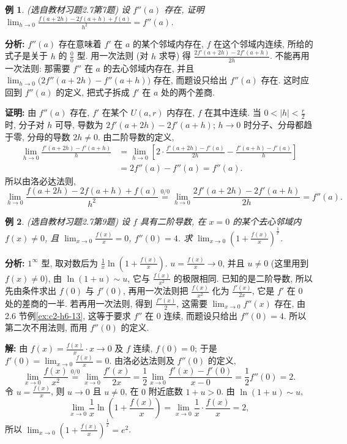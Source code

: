 \documentclass[UTF8,openany]{ctexbook}
\theoremstyle{chinesetextbook}
\newtheorem{example}{例}[section]
\newenvironment{cnproof}{\par\indent\textbf{证明:} \ignorespaces}{\par}
\newenvironment{cnsolution}{\par\indent\textbf{解:} \ignorespaces}{\par}
\begin{document}
\begin{example}\label{ex:c2-h7-7}
\textnormal{(选自教材习题2.7第7题)} 设 $f''(a)$ 存在, 证明 $\displaystyle\lim_{h\to0}\frac{f(a+2h)-2f(a+h)+f(a)}{h^2}=f''(a)$.
\end{example}
\par\indent\textbf{分析:} $f''(a)$ 存在意味着 $f'$ 在 $a$ 的某个邻域内存在, $f$ 在这个邻域内连续, 所给的式子是关于 $h$ 的 $\displaystyle\frac00$ 型. 用一次法则 (对 $h$ 求导) 得 $\displaystyle\frac{2f'(a+2h)-2f'(a+h)}{2h}$. 不能再用一次法则: 那需要 $f''$ 在 $a$ 的去心邻域内存在, 并且 $\displaystyle\lim_{h\to0}\bigl(2f''(a+2h)-f''(a+h)\bigr)$ 存在, 而题设只给出 $f''(a)$ 存在. 这时应回到 $f''(a)$ 的定义, 把式子拆成 $f'$ 在 $a$ 处的两个差商.
\begin{cnproof}
由 $f''(a)$ 存在, $f'$ 在某个 $U(a,r)$ 内存在, $f$ 在其中连续. 当 $\displaystyle0<|h|<\frac r2$ 时, 分子对 $h$ 可导, 导数为 $2f'(a+2h)-2f'(a+h)$; $h\to0$ 时分子、分母都趋于零, 分母的导数 $2h\ne0$. 由二阶导数的定义,
\[
\begin{aligned}
\lim_{h\to0}\frac{f'(a+2h)-f'(a+h)}h&=\lim_{h\to0}\left[2\cdot\frac{f'(a+2h)-f'(a)}{2h}-\frac{f'(a+h)-f'(a)}h\right]\\
&=2f''(a)-f''(a)=f''(a).
\end{aligned}
\]
所以由洛必达法则,
\[
\lim_{h\to0}\frac{f(a+2h)-2f(a+h)+f(a)}{h^2}\overset{0/0}{=}\lim_{h\to0}\frac{2f'(a+2h)-2f'(a+h)}{2h}=f''(a).
\]
\end{cnproof}
\begin{example}\label{ex:c2-h7-9}
\textnormal{(选自教材习题2.7第9题)} 设 $f$ 具有二阶导数, 在 $x=0$ 的某个去心邻域内 $f(x)\ne0$, 且 $\displaystyle\lim_{x\to0}\frac{f(x)}x=0$, $f''(0)=4$. 求 $\displaystyle\lim_{x\to0}\left(1+\frac{f(x)}x\right)^{\frac1x}$.
\end{example}
\par\indent\textbf{分析:} $1^\infty$ 型, 取对数后为 $\displaystyle\frac1x\ln\left(1+\frac{f(x)}x\right)$. $\displaystyle u=\frac{f(x)}x\to0$, 并且 $u\ne0$ (这里用到 $f(x)\ne0$), 由 $\ln(1+u)\sim u$, 它与 $\displaystyle\frac{f(x)}{x^2}$ 的极限相同. 已知的是二阶导数, 所以先由条件求出 $f(0)$ 与 $f'(0)$, 再用一次法则把 $\displaystyle\frac{f(x)}{x^2}$ 化为 $\displaystyle\frac{f'(x)}{2x}$, 它是 $f'$ 在 $0$ 处的差商的一半. 若再用一次法则, 得到 $\displaystyle\frac{f''(x)}2$, 这需要 $\displaystyle\lim_{x\to0}f''(x)$ 存在, 由 2.6 节例\ref{ex:c2-h6-13}, 这等于要求 $f''$ 在 $0$ 连续, 而题设只给出 $f''(0)=4$. 所以第二次不用法则, 而用 $f''(0)$ 的定义.
\begin{cnsolution}
由 $\displaystyle f(x)=\frac{f(x)}x\cdot x\to0$ 及 $f$ 连续, $f(0)=0$; 于是 $\displaystyle f'(0)=\lim_{x\to0}\frac{f(x)}x=0$. 由洛必达法则及 $f''(0)$ 的定义,
\[
\lim_{x\to0}\frac{f(x)}{x^2}\overset{0/0}{=}\lim_{x\to0}\frac{f'(x)}{2x}=\frac12\lim_{x\to0}\frac{f'(x)-f'(0)}{x-0}=\frac12f''(0)=2.
\]
令 $\displaystyle u=\frac{f(x)}x$, 则 $u\to0$ 且 $u\ne0$, 在 $0$ 附近底数 $1+u>0$. 由 $\ln(1+u)\sim u$,
\[
\lim_{x\to0}\frac1x\ln\left(1+\frac{f(x)}x\right)=\lim_{x\to0}\frac1x\cdot\frac{f(x)}x=2,
\]
所以 $\displaystyle\lim_{x\to0}\left(1+\frac{f(x)}x\right)^{\frac1x}=e^2$.
\end{cnsolution}
\end{document}
